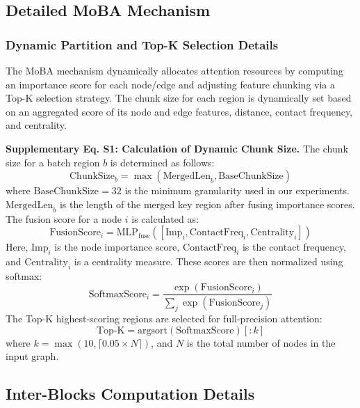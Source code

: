 ﻿\documentclass[11pt,a4paper]{article}
\begin{document}
\subsection{Detailed MoBA Mechanism}

\subsubsection{Dynamic Partition and Top-K Selection Details}

The MoBA mechanism dynamically allocates attention resources by computing an importance score for each node/edge and adjusting feature chunking via a Top-K selection strategy. The chunk size for each region is dynamically set based on an aggregated score of its node and edge features, distance, contact frequency, and centrality.

\textbf{Supplementary Eq. S1: Calculation of Dynamic Chunk Size.}
The chunk size for a batch region $b$ is determined as follows:
\begin{equation}
\text{ChunkSize}_b = \max(\text{MergedLen}_b, \text{BaseChunkSize})
\end{equation}
where $\text{BaseChunkSize}=32$ is the minimum granularity used in our experiments. $\text{MergedLen}_b$ is the length of the merged key region after fusing importance scores. The fusion score for a node $i$ is calculated as:
\begin{equation}
\text{FusionScore}_i = \text{MLP}_{\text{fuse}}\left(\left[ \text{Imp}_i, \text{ContactFreq}_i, \text{Centrality}_i \right]\right)
\end{equation}
Here, $\text{Imp}_i$ is the node importance score, $\text{ContactFreq}_i$ is the contact frequency, and $\text{Centrality}_i$ is a centrality measure. These scores are then normalized using softmax:
\begin{equation}
\text{SoftmaxScore}_i = \frac{\exp(\text{FusionScore}_i)}{\sum_j \exp(\text{FusionScore}_j)}
\end{equation}
The Top-K highest-scoring regions are selected for full-precision attention:
\begin{equation}
\text{Top-K} = \text{argsort}(\text{SoftmaxScore})[:k]
\end{equation}
where $k = \max(10, \lceil 0.05 \times N \rceil)$, and $N$ is the total number of nodes in the input graph.

\subsection{Inter-Blocks Computation Details}
\end{document}
